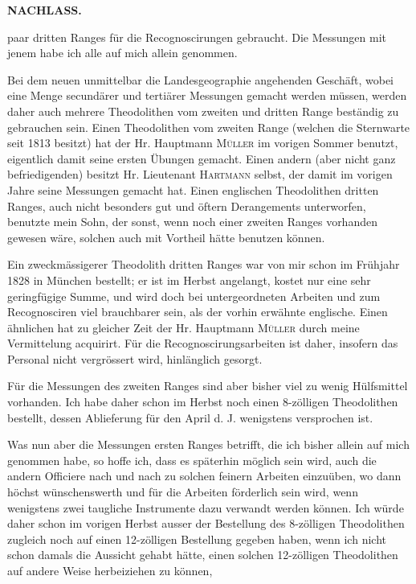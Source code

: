 \par\clearpage
\noindent{}\hfill{\small\textbf{NACHLASS.}}\hfill\null\par\medskip
\noindent paar dritten Ranges für die Recognoscirungen gebraucht. Die Messungen mit jenem habe ich alle auf mich allein genommen.

\par\noindent\hspace*{\parindent}Bei dem neuen unmittelbar die Landesgeographie angehenden Geschäft, wobei eine Menge secundärer und tertiärer Messungen gemacht werden müssen, werden daher auch mehrere Theodolithen vom zweiten und dritten Range beständig zu gebrauchen sein. Einen Theodolithen vom zweiten Range (welchen die Sternwarte seit 1813 besitzt) hat der Hr. Hauptmann \textsc{Müller} im vorigen Sommer benutzt, eigentlich damit seine ersten Übungen gemacht. Einen andern (aber nicht ganz befriedigenden) besitzt Hr. Lieutenant \textsc{Hartmann} selbst, der damit im vorigen Jahre seine Messungen gemacht hat. Einen englischen Theodolithen dritten Ranges, auch nicht besonders gut und öftern Derangements unterworfen, benutzte mein Sohn, der sonst, wenn noch einer zweiten Ranges vorhanden gewesen wäre, solchen auch mit Vortheil hätte benutzen können.

\par\noindent\hspace*{\parindent}Ein zweckmässigerer Theodolith dritten Ranges war von mir schon im Frühjahr 1828 in München bestellt; er ist im Herbst angelangt, kostet nur eine sehr geringfügige Summe, und wird doch bei untergeordneten Arbeiten und zum Recognosciren viel brauchbarer sein, als der vorhin erwähnte englische. Einen ähnlichen hat zu gleicher Zeit der Hr. Hauptmann \textsc{Müller} durch meine Vermittelung acquirirt. Für die Recognoscirungsarbeiten ist daher, insofern das Personal nicht vergrössert wird, hinlänglich gesorgt.

\par\noindent\hspace*{\parindent}Für die Messungen des zweiten Ranges sind aber bisher viel zu wenig Hülfsmittel vorhanden. Ich habe daher schon im Herbst noch einen 8-zölligen Theodolithen bestellt, dessen Ablieferung für den April d. J. wenigstens versprochen ist.

\par\noindent\hspace*{\parindent}Was nun aber die Messungen ersten Ranges betrifft, die ich bisher allein auf mich genommen habe, so hoffe ich, dass es späterhin möglich sein wird, auch die andern Officiere nach und nach zu solchen feinern Arbeiten einzuüben, wo dann höchst wünschenswerth und für die Arbeiten förderlich sein wird, wenn wenigstens zwei taugliche Instrumente dazu verwandt werden können. Ich würde daher schon im vorigen Herbst ausser der Bestellung des 8-zölligen Theodolithen zugleich noch auf einen 12-zölligen Bestellung gegeben haben, wenn ich nicht schon damals die Aussicht gehabt hätte, einen solchen 12-zölligen Theodolithen auf andere Weise herbeiziehen zu können,

